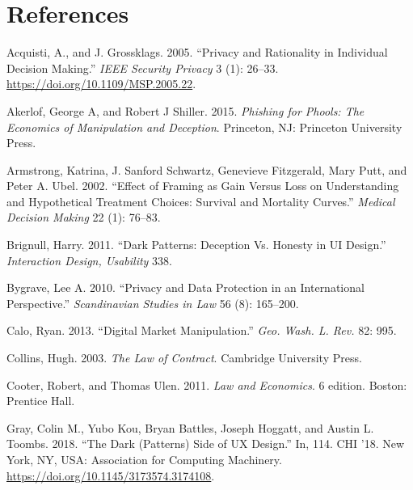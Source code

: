 \documentclass[
  11pt,
  letterpaper,
]{article}
\newlength{\cslhangindent}
\newlength{\cslentryspacingunit} %
\newenvironment{CSLReferences}[2] %
 {%
  \setlength{\parindent}{0pt}
  \ifodd #1
  \let\oldpar\par
  \def\par{\hangindent=\cslhangindent\oldpar}
  \fi
  \setlength{\parskip}{#2\cslentryspacingunit}
 }%
 {}
\begin{document}
\pagebreak

\hypertarget{references}{%
\section*{References}\label{references}}

\hypertarget{refs}{}
\begin{CSLReferences}{1}{0}
\leavevmode{}%
Acquisti, A., and J. Grossklags. 2005. {``Privacy and Rationality in Individual Decision Making.''} \emph{IEEE Security Privacy} 3 (1): 26--33. \url{https://doi.org/10.1109/MSP.2005.22}.

\leavevmode{}%
Akerlof, George A, and Robert J Shiller. 2015. \emph{Phishing for Phools: The Economics of Manipulation and Deception}. Princeton, NJ: Princeton University Press.

\leavevmode{}%
Armstrong, Katrina, J. Sanford Schwartz, Genevieve Fitzgerald, Mary Putt, and Peter A. Ubel. 2002. {``Effect of Framing as Gain Versus Loss on Understanding and Hypothetical Treatment Choices: Survival and Mortality Curves.''} \emph{Medical Decision Making} 22 (1): 76--83.

\leavevmode{}%
Brignull, Harry. 2011. {``Dark Patterns: Deception Vs. Honesty in UI Design.''} \emph{Interaction Design, Usability} 338.

\leavevmode{}%
Bygrave, Lee A. 2010. {``Privacy and Data Protection in an International Perspective.''} \emph{Scandinavian Studies in Law} 56 (8): 165--200.

\leavevmode{}%
Calo, Ryan. 2013. {``Digital Market Manipulation.''} \emph{Geo. Wash. L. Rev.} 82: 995.

\leavevmode{}%
Collins, Hugh. 2003. \emph{The Law of Contract}. Cambridge University Press.

\leavevmode{}%
Cooter, Robert, and Thomas Ulen. 2011. \emph{Law and Economics}. 6 edition. Boston: Prentice Hall.

\leavevmode{}%
Gray, Colin M., Yubo Kou, Bryan Battles, Joseph Hoggatt, and Austin L. Toombs. 2018. {``The Dark (Patterns) Side of UX Design.''} In, 114. CHI '18. New York, NY, USA: Association for Computing Machinery. \url{https://doi.org/10.1145/3173574.3174108}.


\end{CSLReferences}
\end{document}
